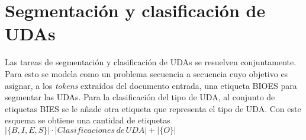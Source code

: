 \documentclass[a4paper,11pt,twocolumn,twoside]{article}
\begin{document}


\section{Segmentación y clasificación de UDAs}


Las tareas de segmentación y clasificación de UDAs se resuelven conjuntamente. Para esto se modela 
como un problema secuencia a secuencia cuyo objetivo es asignar, a los \textit{tokens} extraídos del documento 
entrada, una etiqueta BIOES para segmentar las UDAs. Para la clasificación del tipo 
de UDA, al conjunto de etiquetas BIES se le añade otra etiqueta que representa el tipo de UDA. Con 
este esquema se obtiene una cantidad de etiquetas $|\{B,I,E,S\}| \cdot |Clasificaciones \, de \, UDA| + |\{O\}|$
\end{document}
